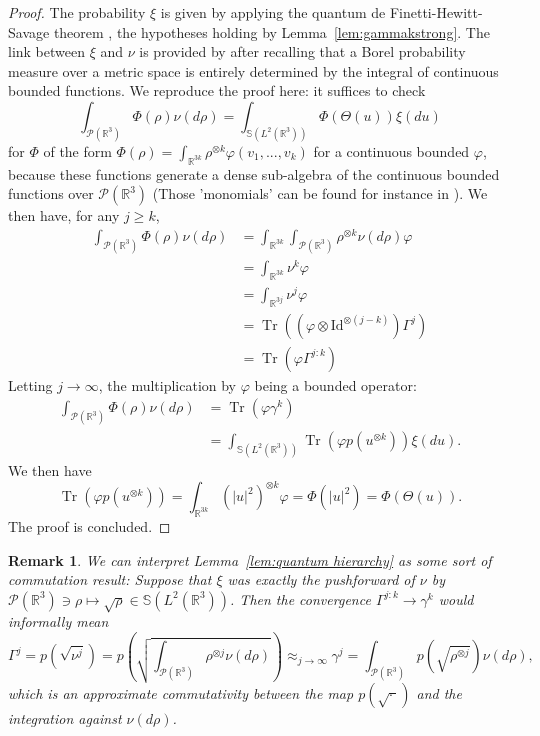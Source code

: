 \documentclass[11pt,a4paper]{article}
\theoremstyle{definition}
\theoremstyle{plain}
\newtheorem{remark}[defi]{Remark}
\DeclareMathOperator*{\Tr}{Tr}
\begin{document}
\begin{proof}
    The probability $\xi$ is given by applying the quantum de Finetti-Hewitt-Savage theorem \cite{HudsonMoody1976}, the hypotheses holding by Lemma~\ref{lem:gammakstrong}. The link between $\xi$ and $\nu$ is provided by \cite[Lemma 3.2]{Rougerie2020} after recalling that a Borel probability measure over a metric space is entirely determined by the integral of continuous bounded functions. We reproduce the proof here:
    it suffices to check
    $$\int_{\mathcal{P}(\mathbb{R}^3)} \Phi(\rho)\nu(d\rho) = \int_{\mathbb{S}(L^2(\mathbb{R}^{3}))} \Phi(\Theta(u))\xi(du)$$
    for $\Phi$ of the form $\Phi(\rho)=\int_{\mathbb{R}^{3k}} \rho^{\otimes k} \varphi(v_1,...,v_k)$ for a continuous bounded $\varphi$, because these functions generate a dense sub-algebra of the continuous bounded functions over $\mathcal{P}(\mathbb{R}^3)$ (Those 'monomials' can be found for instance in \cite{MischlerMouhot2012}). We then have, for any $j\geq k$,
    \begin{align*}
        \int_{\mathcal{P}(\mathbb{R}^3)} \Phi(\rho)\nu(d\rho) &= \int_{\mathbb{R}^{3k}} \int_{\mathcal{P}(\mathbb{R}^3)} \rho^{\otimes k} \nu(d\rho)\varphi  \\
        &=\int_{\mathbb{R}^{3k}} \nu^k \varphi\\
        &=\int_{\mathbb{R}^{3j}} \nu^j \varphi\\
        &=\Tr((\varphi\otimes \text{Id}^{\otimes(j-k)} )\Gamma^{j})\\
        &=\Tr(\varphi \Gamma^{j:k})
    \end{align*}
    Letting $j\rightarrow\infty$, the multiplication by $\varphi$ being a bounded operator:
     \begin{align*}
        \int_{\mathcal{P}(\mathbb{R}^3)} \Phi(\rho)\nu(d\rho) &=
        \Tr(\varphi \gamma^{k})\\
        &=\int_{\mathbb{S}(L^2(\mathbb{R}^3))} \Tr(\varphi p(u^{\otimes k})) \xi(du).
    \end{align*}
    We then have
    $$\Tr(\varphi p(u^{\otimes k})) = \int_{\mathbb{R}^{3k}} (\vert u \vert^2)^{\otimes k} \varphi = \Phi(\vert u \vert^2) = \Phi(\Theta(u)). $$
    The proof is concluded.
\end{proof}

\begin{remark}
    We can interpret Lemma~\ref{lem:quantum hierarchy} as some sort of commutation result: Suppose that $\xi$ was exactly the pushforward of $\nu$ by $\mathcal{P}(\mathbb{R}^3) \ni \rho \mapsto \sqrt{\rho} \in \mathbb{S}(L^2(\mathbb{R}^{3}))$. Then the convergence $\Gamma^{j:k}\rightarrow \gamma^k$ would informally mean
    $$\Gamma^j=p\left(\sqrt{\nu^j}\right)=p\left(\sqrt{\int_{\mathcal{P}(\mathbb{R}^3)} \rho^{\otimes j}\nu(d\rho)}\right)\approx_{j\rightarrow\infty} \gamma^j = \int_{\mathcal{P}(\mathbb{R}^3)} p(\sqrt{\rho^{\otimes j}})\nu(d\rho),$$ 
    which is an approximate commutativity between the map
    $p(\sqrt{ \cdot\  })$ and the integration against $\nu(d\rho)$.
\end{remark}
\end{document}
